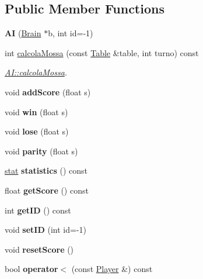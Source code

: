 \subsection*{Public Member Functions}
\begin{DoxyCompactItemize}
\item 
\mbox{\label{classAI_a960e91a972f13b9ee7e9348a2afa6e77}} 
{\bfseries AI} (\hyperlink{classBrain}{Brain} $\ast$b, int id=-\/1)
\item 
int \hyperlink{classAI_a5ddd05acc3177d4e7a756f7cfc2c3f64}{calcola\+Mossa} (const \hyperlink{classTable}{Table} \&table, int turno) const
\begin{DoxyCompactList}\small\item\em \hyperlink{classAI_a5ddd05acc3177d4e7a756f7cfc2c3f64}{A\+I\+::calcola\+Mossa}. \end{DoxyCompactList}\item 
\mbox{\label{classAI_ae83a9db8d9b08b349bc8e089155ab8b4}} 
void {\bfseries add\+Score} (float s)
\item 
\mbox{\label{classAI_ace2cfc3e36b418f1517965c49941fc82}} 
void {\bfseries win} (float s)
\item 
\mbox{\label{classAI_a1f9260c8e7d05740078f022fac8e41f7}} 
void {\bfseries lose} (float s)
\item 
\mbox{\label{classAI_a2d48915a47b0ba41ab39e7e1d778a861}} 
void {\bfseries parity} (float s)
\item 
\mbox{\label{classAI_a4a2fca8f4558c5eefca6e7a8f72d953f}} 
\hyperlink{structstat}{stat} {\bfseries statistics} () const
\item 
\mbox{\label{classAI_ac4c6a612da44dc592114d29daf9a9dea}} 
float {\bfseries get\+Score} () const
\item 
\mbox{\label{classAI_aa7e70fc5d035c94be8ee88a928cfb005}} 
int {\bfseries get\+ID} () const
\item 
\mbox{\label{classAI_a5195ab988169b68281a423d3eed1911f}} 
void {\bfseries set\+ID} (int id=-\/1)
\item 
\mbox{\label{classAI_a4adef146c29d24ac5a3c5a10f1315834}} 
void {\bfseries reset\+Score} ()
\item 
\mbox{\label{classAI_a07c09b5f832f252e117cbdf16e7ae879}} 
bool {\bfseries operator$<$} (const \hyperlink{classPlayer}{Player} \&) const
\end{DoxyCompactItemize}
